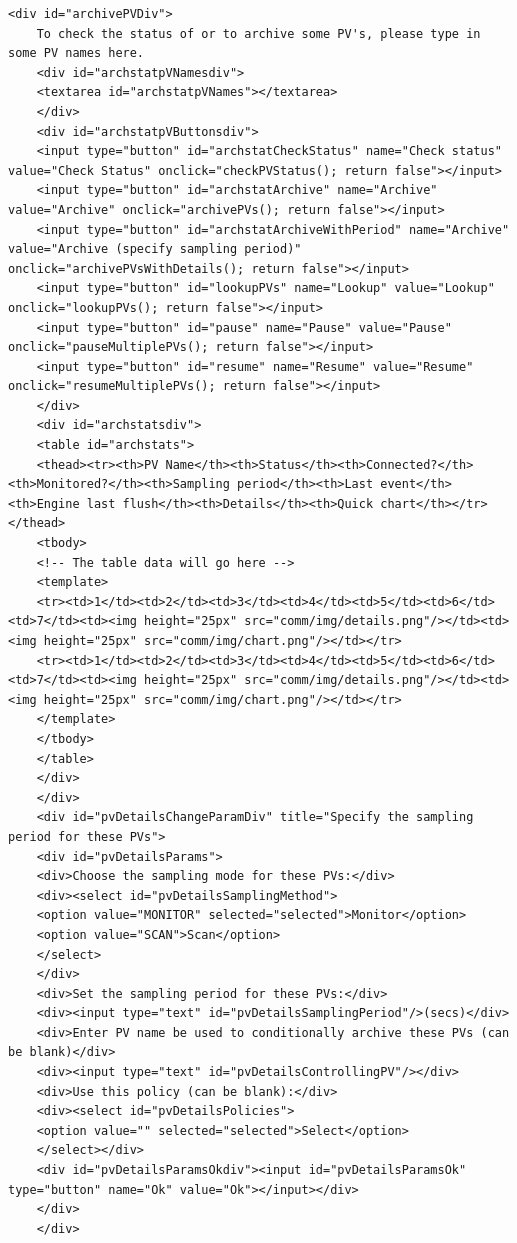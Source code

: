 \documentclass[11pt
  , a4paper
  , article
  , oneside
]{memoir}
\begin{document}
\begin{itemize}
\begin{lstlisting}[style=termstyle]
	<div id="archivePVDiv">
	To check the status of or to archive some PV's, please type in some PV names here.
	<div id="archstatpVNamesdiv">
	<textarea id="archstatpVNames"></textarea>
	</div>
	<div id="archstatpVButtonsdiv">
	<input type="button" id="archstatCheckStatus" name="Check status" value="Check Status" onclick="checkPVStatus(); return false"></input> 
	<input type="button" id="archstatArchive" name="Archive" value="Archive" onclick="archivePVs(); return false"></input> 
	<input type="button" id="archstatArchiveWithPeriod" name="Archive" value="Archive (specify sampling period)" onclick="archivePVsWithDetails(); return false"></input> 
	<input type="button" id="lookupPVs" name="Lookup" value="Lookup" onclick="lookupPVs(); return false"></input> 
	<input type="button" id="pause" name="Pause" value="Pause" onclick="pauseMultiplePVs(); return false"></input> 
	<input type="button" id="resume" name="Resume" value="Resume" onclick="resumeMultiplePVs(); return false"></input> 
	</div>
	<div id="archstatsdiv">
	<table id="archstats">
	<thead><tr><th>PV Name</th><th>Status</th><th>Connected?</th><th>Monitored?</th><th>Sampling period</th><th>Last event</th><th>Engine last flush</th><th>Details</th><th>Quick chart</th></tr></thead>
	<tbody>
	<!-- The table data will go here -->
	<template>
	<tr><td>1</td><td>2</td><td>3</td><td>4</td><td>5</td><td>6</td><td>7</td><td><img height="25px" src="comm/img/details.png"/></td><td><img height="25px" src="comm/img/chart.png"/></td></tr>
	<tr><td>1</td><td>2</td><td>3</td><td>4</td><td>5</td><td>6</td><td>7</td><td><img height="25px" src="comm/img/details.png"/></td><td><img height="25px" src="comm/img/chart.png"/></td></tr>
	</template>
	</tbody>
	</table>
	</div>
	</div>
	<div id="pvDetailsChangeParamDiv" title="Specify the sampling period for these PVs">
	<div id="pvDetailsParams">
	<div>Choose the sampling mode for these PVs:</div>
	<div><select id="pvDetailsSamplingMethod">
	<option value="MONITOR" selected="selected">Monitor</option>
	<option value="SCAN">Scan</option>
	</select> 
	</div>
	<div>Set the sampling period for these PVs:</div>
	<div><input type="text" id="pvDetailsSamplingPeriod"/>(secs)</div>
	<div>Enter PV name be used to conditionally archive these PVs (can be blank)</div>
	<div><input type="text" id="pvDetailsControllingPV"/></div>
	<div>Use this policy (can be blank):</div>
	<div><select id="pvDetailsPolicies">
	<option value="" selected="selected">Select</option>
	</select></div>
	<div id="pvDetailsParamsOkdiv"><input id="pvDetailsParamsOk" type="button" name="Ok" value="Ok"></input></div>
	</div>
	</div>
	

\end{lstlisting}
\end{itemize}
\end{document}
